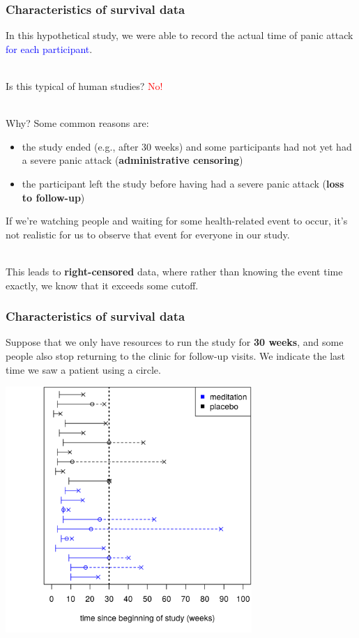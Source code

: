 \documentclass[10pt,t]{beamer}
\begin{document}
\begin{frame}
\frametitle{Characteristics of survival data}
In this hypothetical study, we were able to record the actual time of panic attack \textcolor{blue}{for each participant}.
\\ ~\ 

Is this typical of human studies? \pause \textcolor{red}{No!}
\\ ~\ 

Why? \pause Some common reasons are:
\begin{itemize}
\item the study ended (e.g., after 30 weeks) and some participants had not yet had a severe panic attack (\textbf{administrative censoring})
\item the participant left the study before having had a severe panic attack (\textbf{loss to follow-up})
\end{itemize}
If we're watching people and waiting for some health-related event to occur, it's not realistic for us to observe that event for everyone in our study. 
\\ ~\ 

This leads to \textbf{right-censored} data, where rather than knowing the event time exactly, we know that it exceeds some cutoff.
\end{frame}

\begin{frame}
\frametitle{Characteristics of survival data}
\vspace{-0.8cm}
Suppose that we only have resources to run the study for \textbf{30 weeks}, and some people also stop returning to the clinic for follow-up visits. We indicate the last time we saw a patient using a circle. \pause
\begin{center}
\includegraphics[width=0.7\textwidth]{figs/meditation_censored_study_time.png}
\end{center}
\end{frame}
\end{document}
